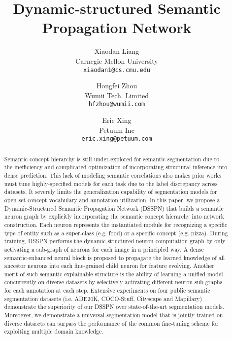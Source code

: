 \documentclass[10pt,twocolumn,letterpaper]{article}
\begin{document}
\title{Dynamic-structured Semantic Propagation Network}

\author{Xiaodan Liang\\
Carnegie Mellon University\\
{\tt\small xiaodan1@cs.cmu.edu}
\and
Hongfei Zhou\\
Wumii Tech. Limited\\
{\tt\small hfzhou@wumii.com}
\and
Eric Xing\\
Petuum Inc\\
{\tt\small eric.xing@petuum.com}
}

\maketitle


\begin{abstract}

Semantic concept hierarchy is still under-explored for semantic segmentation due to the inefficiency and complicated optimization of incorporating structural inference into dense prediction. This lack of modeling semantic correlations also makes prior works must tune highly-specified models for each task due to the label discrepancy across datasets. It severely limits the generalization capability of segmentation models for open set concept vocabulary and annotation utilization. In this paper, we propose a Dynamic-Structured Semantic Propagation Network (DSSPN) that builds a semantic neuron graph by explicitly incorporating the semantic concept hierarchy into network construction. Each neuron represents the instantiated module for recognizing a specific type of entity such as a super-class (e.g. food) or a specific concept (e.g. pizza). During training, DSSPN performs the dynamic-structured neuron computation graph by only activating a sub-graph of neurons for each image in a principled way. A dense semantic-enhanced neural block is proposed to propagate the learned knowledge of all ancestor neurons into each fine-grained child neuron for feature evolving. Another merit of such semantic explainable structure is the ability of learning a unified model concurrently on diverse datasets by selectively activating different neuron sub-graphs for each annotation at each step. Extensive experiments on four public semantic segmentation datasets (i.e. ADE20K, COCO-Stuff, Cityscape and Mapillary) demonstrate the superiority of our DSSPN over state-of-the-art segmentation models. Moreoever, we demonstrate a universal segmentation model that is jointly trained on diverse datasets can surpass the performance of the common fine-tuning scheme for exploiting multiple domain knowledge.
   
\end{abstract}
\end{document}
